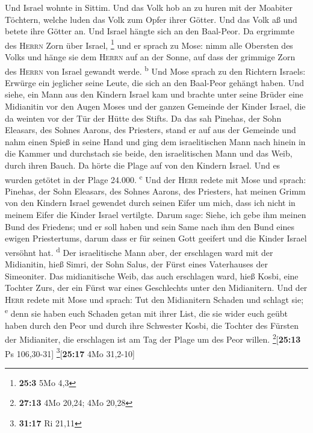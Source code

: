  Und Israel wohnte in Sittim. Und das Volk hob an zu huren
mit der Moabiter Töchtern,  welche luden das Volk zum
Opfer ihrer Götter. Und das Volk aß und betete ihre Götter an.
 Und Israel hängte sich an den Baal-Peor. Da ergrimmte des
\textsc{Herrn} Zorn über Israel, \footnote{\textbf{25:3} 5Mo 4,3}
 und er sprach zu Mose: nimm alle Obersten des Volks und
hänge sie dem \textsc{Herrn} auf an der Sonne, auf dass der grimmige
Zorn des \textsc{Herrn} von Israel gewandt werde. \textsuperscript{b}
 Und Mose sprach zu den Richtern Israels: Erwürge ein
jeglicher seine Leute, die sich an den Baal-Peor gehängt haben.
 Und siehe, ein Mann aus den Kindern Israel kam und
brachte unter seine Brüder eine Midianitin vor den Augen Moses und der
ganzen Gemeinde der Kinder Israel, die da weinten vor der Tür der Hütte
des Stifts.  Da das sah Pinehas, der Sohn Eleasars, des
Sohnes Aarons, des Priesters, stand er auf aus der Gemeinde und nahm
einen Spieß in seine Hand  und ging dem israelitischen
Mann nach hinein in die Kammer und durchstach sie beide, den
israelitischen Mann und das Weib, durch ihren Bauch. Da hörte die Plage
auf von den Kindern Israel.  Und es wurden getötet in der
Plage 24.000. \textsuperscript{c}  Und der \textsc{Herr}
redete mit Mose und sprach:  Pinehas, der Sohn Eleasars,
des Sohnes Aarons, des Priesters, hat meinen Grimm von den Kindern
Israel gewendet durch seinen Eifer um mich, dass ich nicht in meinem
Eifer die Kinder Israel vertilgte.  Darum sage: Siehe,
ich gebe ihm meinen Bund des Friedens;  und er soll haben
und sein Same nach ihm den Bund eines ewigen Priestertums, darum dass er
für seinen Gott geeifert und die Kinder Israel versöhnt hat.
\textsuperscript{d}  Der israelitische Mann aber, der
erschlagen ward mit der Midianitin, hieß Simri, der Sohn Salus, der
Fürst eines Vaterhauses der Simeoniter.  Das
midianitische Weib, das auch erschlagen ward, hieß Kosbi, eine Tochter
Zurs, der ein Fürst war eines Geschlechts unter den Midianitern.
 Und der \textsc{Herr} redete mit Mose und sprach:
 Tut den Midianitern Schaden und schlagt sie;
\textsuperscript{e}  denn sie haben euch Schaden getan
mit ihrer List, die sie wider euch geübt haben durch den Peor und durch
ihre Schwester Kosbi, die Tochter des Fürsten der Midianiter, die
erschlagen ist am Tag der Plage um des Peor willen.
\footnote{\textbf{27:13} 4Mo 20,24; 4Mo 20,28}{[}\textbf{25:13} Ps
106,30-31{]} \footnote{\textbf{31:17} Ri 21,11}{[}\textbf{25:17} 4Mo
31,2-10{]}

